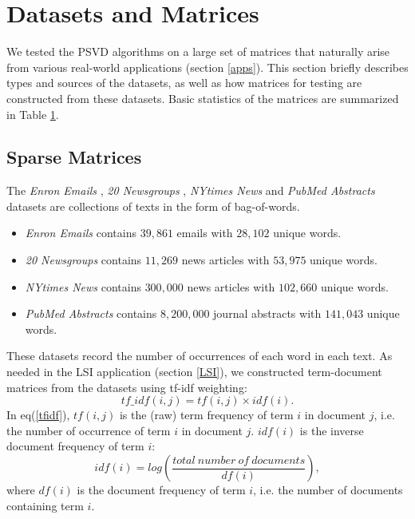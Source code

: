 \documentclass[11pt]{article}
\numberwithin{equation}{section}
\numberwithin{figure}{section}
\numberwithin{table}{section}
\begin{document}
\section{Datasets and Matrices}
\label{dataset}
We tested the PSVD algorithms on a large set of matrices that naturally arise from various real-world applications (section \ref{apps}). This section briefly describes types and sources of the datasets, as well as how matrices for testing are constructed from these datasets. Basic statistics of the matrices are summarized in Table \ref{dataset}.

\subsection{Sparse Matrices}
\label{sparse_mat}

The \textit{Enron Emails} \cite{UCI_data}, \textit{20 Newsgroups} \cite{news20}, \textit{NYtimes News} \cite{UCI_data} and \textit{PubMed Abstracts} \cite{UCI_data} datasets are collections of texts in the form of bag-of-words.
\begin{itemize}
\item \textit{Enron Emails} contains $39,861$ emails with $28,102$ unique words.
\item \textit{20 Newsgroups} contains $11,269$ news articles with $53,975$ unique words.
\item \textit{NYtimes News} contains $300,000$ news articles with $102,660$ unique words.
\item \textit{PubMed Abstracts} contains $8,200,000$ journal abstracts with $141,043$ unique words.
\end{itemize}
These datasets record the number of occurrences of each word in each text. As needed in the LSI application (section \ref{LSI}), we constructed term-document matrices from the datasets using tf-idf weighting:
\begin{equation}
tf\_idf(i,j) = tf(i,j) \times idf(i).
\label{tfidf}
\end{equation}
In eq(\ref{tfidf}), $tf(i,j)$ is the (raw) term frequency of term $i$ in document $j$, i.e. the number of occurrence of term $i$ in document $j$. $idf(i)$ is the inverse document frequency of term $i$:
\begin{equation}
idf(i) = log\left(\frac{total~number~of~documents}{df(i)}\right),
\end{equation}
where $df(i)$ is the document frequency of term $i$, i.e. the number of documents containing term $i$.
\end{document}
